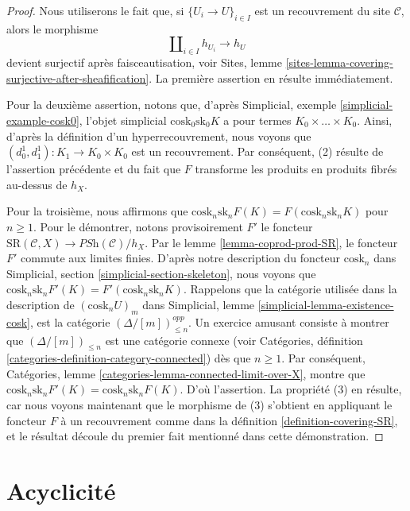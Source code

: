 \begin{proof}
Nous utiliserons le fait que, si
$\{U_i \to U\}_{i \in I}$ est un recouvrement du site
$\mathcal{C}$, alors le morphisme
$$
\amalg_{i \in I} h_{U_i} \to h_U
$$
devient surjectif après faisceautisation, voir
Sites, lemme \ref{sites-lemma-covering-surjective-after-sheafification}.
La première assertion en résulte immédiatement.

\medskip\noindent
Pour la deuxième assertion, notons que, d'après
Simplicial, exemple \ref{simplicial-example-cosk0},
l'objet simplicial $\text{cosk}_0 \text{sk}_0 K$
a pour termes $K_0 \times \ldots \times K_0$. Ainsi,
d'après la définition d'un hyperrecouvrement, nous
voyons que $(d^1_0, d^1_1) : K_1 \to K_0 \times K_0$ est un
recouvrement. Par conséquent, (2) résulte de l'assertion précédente
et du fait que $F$ transforme les produits en produits
fibrés au-dessus de $h_X$.

\medskip\noindent
Pour la troisième, nous affirmons que
$\text{cosk}_n \text{sk}_n F(K) =
F(\text{cosk}_n \text{sk}_n K)$ pour $n \geq 1$.
Pour le démontrer, notons provisoirement $F'$ le foncteur
$\text{SR}(\mathcal{C}, X) \to \textit{PSh}(\mathcal{C})/h_X$.
Par le lemme \ref{lemma-coprod-prod-SR}, le foncteur
$F'$ commute aux limites finies.
D'après notre description du foncteur $\text{cosk}_n$ dans
Simplicial, section \ref{simplicial-section-skeleton},
nous voyons que $\text{cosk}_n \text{sk}_n F'(K) =
F'(\text{cosk}_n \text{sk}_n K)$.
Rappelons que la catégorie utilisée dans la description de
$(\text{cosk}_n U)_m$ dans
Simplicial, lemme \ref{simplicial-lemma-existence-cosk},
est la catégorie $(\Delta/[m])^{opp}_{\leq n}$. Un exercice
amusant consiste à montrer que $(\Delta/[m])_{\leq n}$ est
une catégorie connexe (voir
Catégories, définition \ref{categories-definition-category-connected})
dès que $n \geq 1$. Par conséquent,
Catégories, lemme \ref{categories-lemma-connected-limit-over-X},
montre que $\text{cosk}_n \text{sk}_n F'(K) =
\text{cosk}_n \text{sk}_n F(K)$. D'où l'assertion.
La propriété (3) en résulte, car nous voyons maintenant que
le morphisme de (3) s'obtient en appliquant le
foncteur $F$ à un recouvrement comme dans la définition \ref{definition-covering-SR},
et le résultat découle du premier fait mentionné
dans cette démonstration.
\end{proof}



\section{Acyclicité}
\label{section-acyclicity}

